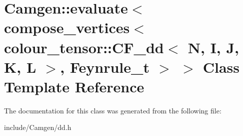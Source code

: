 \hypertarget{a00155}{}\section{Camgen\+:\+:evaluate$<$ compose\+\_\+vertices$<$ colour\+\_\+tensor\+:\+:C\+F\+\_\+dd$<$ N, I, J, K, L $>$, Feynrule\+\_\+t $>$ $>$ Class Template Reference}
\label{a00155}


The documentation for this class was generated from the following file\+:\begin{DoxyCompactItemize}
\item 
include/\+Camgen/dd.\+h\end{DoxyCompactItemize}

